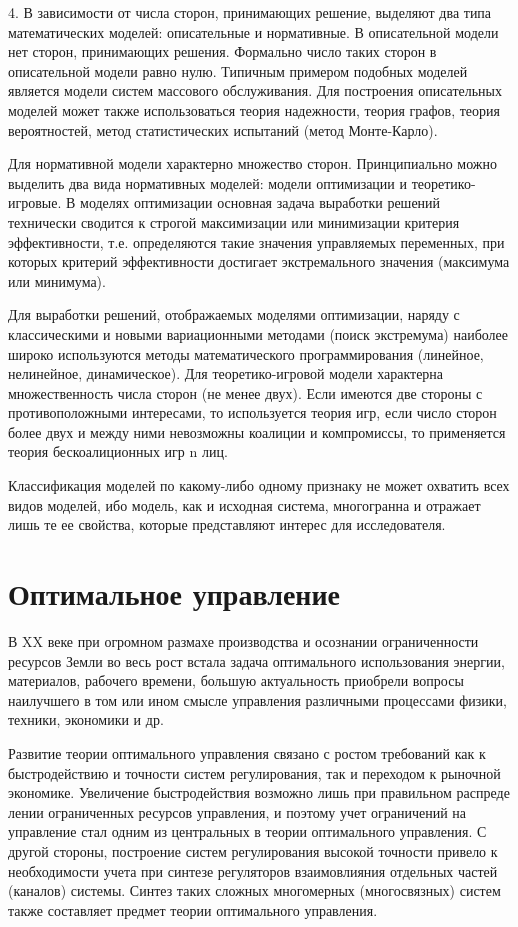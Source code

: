 4. В зависимости от числа сторон, принимающих решение, выделяют два типа математических моделей: описательные и нормативные. В описательной модели нет сторон, принимающих решения. Формально число таких сторон в описательной модели равно нулю. Типичным примером подобных моделей является модели систем массового обслуживания. Для построения описательных моделей может также использоваться теория надежности, теория графов, теория вероятностей, метод статистических испытаний (метод Монте-Карло).


Для нормативной модели характерно множество сторон. Принципиально можно выделить два вида нормативных моделей: модели оптимизации и теоретико-игровые. В моделях оптимизации основная задача выработки решений технически сводится к строгой максимизации или минимизации критерия эффективности, т.е. определяются такие значения управляемых переменных, при которых критерий эффективности достигает экстремального значения (максимума или минимума).


Для выработки решений, отображаемых моделями оптимизации, наряду с классическими и новыми вариационными методами (поиск экстремума) наиболее широко используются методы математического программирования (линейное, нелинейное, динамическое). Для теоретико-игровой модели характерна множественность числа сторон (не менее двух). Если имеются две стороны с противоположными интересами, то используется теория игр, если число сторон более двух и между ними невозможны коалиции и компромиссы, то применяется теория бескоалиционных игр n лиц.


Классификация моделей по какому-либо одному признаку не может охватить всех видов моделей, ибо модель, как и исходная система, многогранна и отражает лишь те ее свойства, которые представляют интерес для исследователя.


\section{ Оптимальное управление}


В XX веке при огромном размахе производства и осознании ограниченности ресурсов Земли во весь рост встала задача оптимального использования энергии, материалов, рабочего времени, большую актуальность приобрели вопросы наилучшего в том или ином смысле управления различными процессами физики, техники, экономики и др.


 Развитие теории оптимального управления связано с ростом требований как к быстродействию и точности систем регулирования, так и переходом к рыночной экономике. Увеличение быстродействия возможно лишь при правильном распреде лении ограниченных ресурсов управления, и поэтому учет ограничений на управление стал одним из центральных в теории оптимального управления. С другой стороны, построение систем регулирования высокой точности привело к необходимости учета при синтезе регуляторов взаимовлияния отдельных частей (каналов) системы. Синтез таких сложных многомерных (многосвязных) систем также составляет предмет теории оптимального управления.
 
